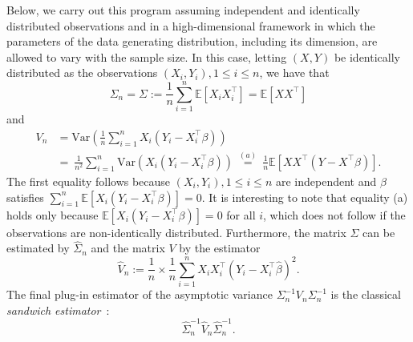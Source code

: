 \documentclass[11pt]{article}
\let\hat\widehat
\begin{document}
Below, we carry out this program assuming independent and identically distributed observations and in a high-dimensional framework in which the parameters of the data generating distribution, including its dimension, are allowed to vary with the sample size. In this case, letting $(X, Y)$ be identically distributed as the observations $(X_i, Y_i), 1\le i\le n$, we have that 
\[
\Sigma_n = \Sigma := \frac{1}{n}\sum_{i=1}^n \mathbb{E}[X_iX_i^{\top}] = \mathbb{E}[XX^{\top}] 
\]
and
\begin{align*}
V_n &= \mbox{Var}\left(\frac{1}{n}\sum_{i=1}^n X_i(Y_i - X_i^{\top}\beta)\right)\\ 
~&=~ \frac{1}{n^2}\sum_{i=1}^n \mbox{Var}(X_i(Y_i - X_i^{\top}\beta)) ~\overset{(a)}{=}~ \frac{1}{n}\mathbb{E}[XX^{\top}(Y - X^{\top}\beta)].
\end{align*}
The first equality follows because $(X_i, Y_i), 1\le i\le n$ are independent and $\beta$ satisfies $\sum_{i=1}^n \mathbb{E}[X_i(Y_i - X_i^{\top}\beta)] = 0$. It is interesting to note that equality (a) holds only because $\mathbb{E}[X_i(Y_i - X_i^{\top}\beta)] = 0$ for all $i$, which does not follow if the observations are non-identically distributed.
Furthermore,  the matrix $\Sigma$ can be estimated by $\widehat{\Sigma}_n$ and the matrix $V$ by the estimator
\[
\widehat{V}_n := \frac{1}{n}\times\frac{1}{n}\sum_{i=1}^n X_iX_i^{\top}(Y_i - X_i^{\top}\hat{\beta})^2. 
\]
The final plug-in estimator of the
asymptotic variance $\Sigma_n^{-1}V_n\Sigma_n^{-1}$ is the classical
{\em sandwich estimator}~\citep{White1980,Buja14}:
\[
\widehat{\Sigma}_n^{-1}\widehat{V}_n\widehat{\Sigma}_n^{-1}.
\]
%
%
\end{document}

